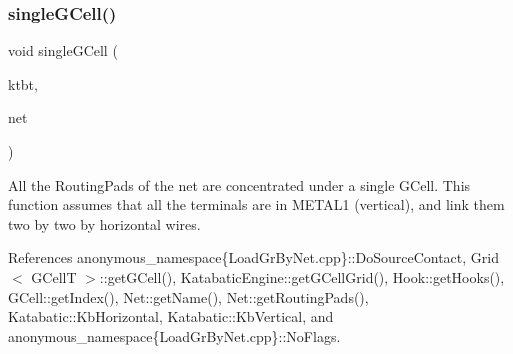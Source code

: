 \mbox{\label{group__LoadGlobalRouting_ga3973291866b39c10cea5ca17f7d174fb}} 
\subsubsection{\texorpdfstring{single\+G\+Cell()}{singleGCell()}}
{\footnotesize\ttfamily void single\+G\+Cell (\begin{DoxyParamCaption}\item[{\hyperlink{classKatabatic_1_1KatabaticEngine}{Katabatic\+Engine} $\ast$}]{ktbt,  }\item[{\textbf{ Net} $\ast$}]{net }\end{DoxyParamCaption})}

All the Routing\+Pads of the net are concentrated under a single G\+Cell. This function assumes that all the terminals are in {\ttfamily M\+E\+T\+A\+L1} (vertical), and link them two by two by horizontal wires. 

References anonymous\+\_\+namespace\{\+Load\+Gr\+By\+Net.\+cpp\}\+::\+Do\+Source\+Contact, Grid$<$ G\+Cell\+T $>$\+::get\+G\+Cell(), Katabatic\+Engine\+::get\+G\+Cell\+Grid(), Hook\+::get\+Hooks(), G\+Cell\+::get\+Index(), Net\+::get\+Name(), Net\+::get\+Routing\+Pads(), Katabatic\+::\+Kb\+Horizontal, Katabatic\+::\+Kb\+Vertical, and anonymous\+\_\+namespace\{\+Load\+Gr\+By\+Net.\+cpp\}\+::\+No\+Flags.

